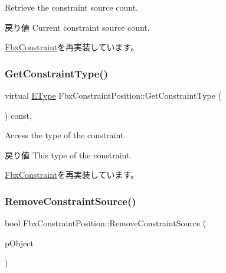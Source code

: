Retrieve the constraint source count. \begin{DoxyReturn}{戻り値}
Current constraint source count. 
\end{DoxyReturn}


\hyperlink{class_fbx_constraint_aa702f86c6a1832ce3b4905911e66c58f}{Fbx\+Constraint}を再実装しています。

\mbox{\label{class_fbx_constraint_position_a79f710b1fec4b1285b53dec13ea68824}} 
\subsubsection{\texorpdfstring{Get\+Constraint\+Type()}{GetConstraintType()}}
{\footnotesize\ttfamily virtual \hyperlink{class_fbx_constraint_a49c1634663395eab7c28856df233ec66}{E\+Type} Fbx\+Constraint\+Position\+::\+Get\+Constraint\+Type (\begin{DoxyParamCaption}{ }\end{DoxyParamCaption}) const\hspace{0.3cm}{\ttfamily [protected]}, {\ttfamily [virtual]}}

Access the type of the constraint. \begin{DoxyReturn}{戻り値}
This type of the constraint. 
\end{DoxyReturn}


\hyperlink{class_fbx_constraint_adbeea66a1a605531a019aa6df90dc45b}{Fbx\+Constraint}を再実装しています。

\mbox{\label{class_fbx_constraint_position_a7d496553504b797425ca2a055212f2ad}} 
\subsubsection{\texorpdfstring{Remove\+Constraint\+Source()}{RemoveConstraintSource()}}
{\footnotesize\ttfamily bool Fbx\+Constraint\+Position\+::\+Remove\+Constraint\+Source (\begin{DoxyParamCaption}\item[{\hyperlink{class_fbx_object}{Fbx\+Object} $\ast$}]{p\+Object }\end{DoxyParamCaption})}

